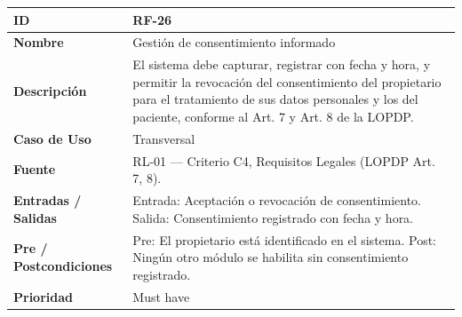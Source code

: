 \documentclass[
]{article}
\newcounter{none} %
\begin{document}
{\def\LTcaptype{none} %
\begin{longtable}[]{|
  >{\raggedright\arraybackslash}p{}|
  >{\raggedright\arraybackslash}p{}|}
\hline
\begin{minipage}[b]{\linewidth}\raggedright
\textbf{ID}
\end{minipage} & \begin{minipage}[b]{\linewidth}\raggedright
RF-26
\end{minipage} \\
\hline
\endhead
\hline
\endlastfoot
\textbf{Nombre} & \begin{minipage}[t]{\linewidth}\raggedright
Gestión de consentimiento informado
\end{minipage} \\
\hline
\textbf{Descripción} & \begin{minipage}[t]{\linewidth}\raggedright
El sistema debe capturar, registrar con fecha y hora, y permitir la revocación del consentimiento del propietario para el tratamiento de sus datos personales y los del paciente, conforme al Art. 7 y Art. 8 de la LOPDP.
\end{minipage} \\
\hline
\textbf{Caso de Uso} & \begin{minipage}[t]{\linewidth}\raggedright
Transversal
\end{minipage} \\
\hline
\textbf{Fuente} & \begin{minipage}[t]{\linewidth}\raggedright
RL-01 — Criterio C4, Requisitos Legales (LOPDP Art. 7, 8).
\end{minipage} \\
\hline
\textbf{Entradas / Salidas} & \begin{minipage}[t]{\linewidth}\raggedright
Entrada: Aceptación o revocación de consentimiento. Salida: Consentimiento registrado con fecha y hora.
\end{minipage} \\
\hline
\textbf{Pre / Postcondiciones} & \begin{minipage}[t]{\linewidth}\raggedright
Pre: El propietario está identificado en el sistema. Post: Ningún otro módulo se habilita sin consentimiento registrado.
\end{minipage} \\
\hline
\textbf{Prioridad} & \begin{minipage}[t]{\linewidth}\raggedright
Must have
\end{minipage} \\

\end{longtable}}
\end{document}
